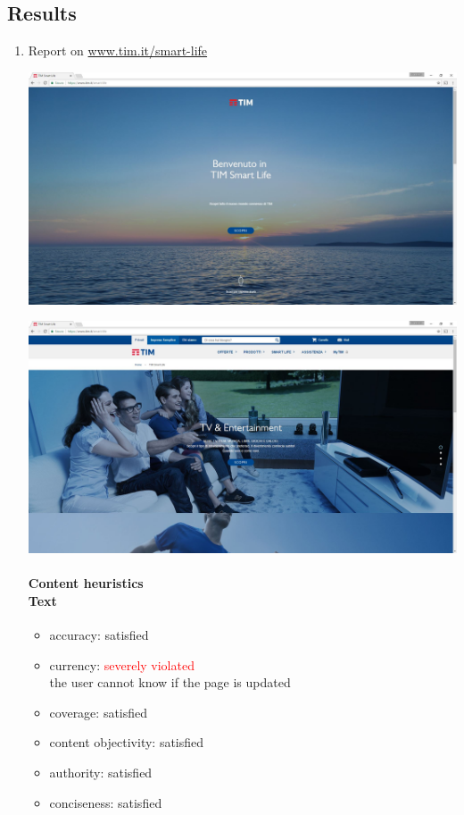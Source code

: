 \subsection{Results}
\begin{enumerate}
	
	
\item Report on \url{www.tim.it/smart-life}

\begin{center}
	\includegraphics[width=\textwidth]{Screenshot/smartlife1.jpg}
\end{center}
\begin{center}
	\includegraphics[width=\textwidth]{Screenshot/smartlife2.jpg}
\end{center}
\vspace{1cm}

	\paragraph*{Content heuristics \\ Text}
	\begin{itemize}
		\item accuracy: satisfied
		\item currency: \textcolor{red}{severely violated}\\
		the user cannot know if the page is updated
		\item coverage: satisfied
		\item content objectivity: satisfied
		\item authority: satisfied
		\item conciseness: satisfied		
	\end{itemize}
	

\end{enumerate}
